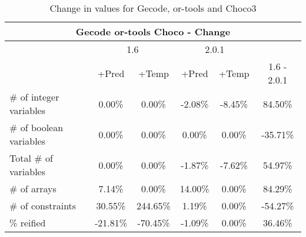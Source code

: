 \documentclass{standalone}
\begin{document}
\begin{table}[H]
\footnotesize
\centering
\begin{tabular}{lc|c|c|c|c}
\multicolumn{6}{c}{Gecode or-tools Choco - Change} \\ 
\hline\hline  & \multicolumn{2}{c|}{1.6} &\multicolumn{2}{c|}{2.0.1} &\\ 
\hline  & +Pred & +Temp & +Pred & +Temp & 1.6 - 2.0.1\\
\# of integer variables & 0.00\% & 0.00\% & -2.08\% & -8.45\% & 84.50\% \\ 
\# of boolean variables & 0.00\% & 0.00\% & 0.00\% & 0.00\% & -35.71\% \\
Total \# of variables   & 0.00\% & 0.00\% & -1.87\% & -7.62\% & 54.97\% \\ 
\# of arrays            & 7.14\% & 0.00\% & 14.00\% & 0.00\% & 84.29\% \\
\# of constraints       & 30.55\% & 244.65\% & 1.19\% & 0.00\% & -54.27\% \\ 
\% reified               & -21.81\% & -70.45\% & -1.09\% & 0.00\% & 36.46\%\\ 
\end{tabular}\caption{Change in values for Gecode, or-tools and Choco3}
\end{table}
\end{document}
